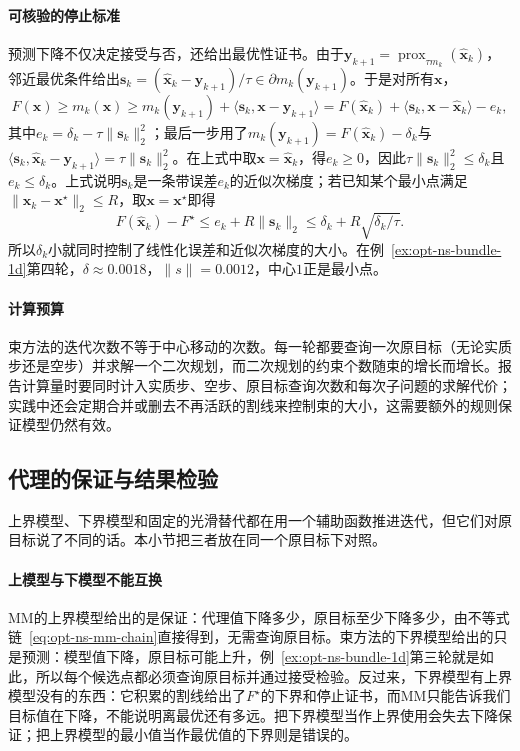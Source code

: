 \paragraph{可核验的停止标准}
预测下降不仅决定接受与否，还给出最优性证书。由于$\bm y_{k+1}=\operatorname{prox}_{\tau m_k}(\hat{\bm x}_k)$，邻近最优条件给出$\bm s_k=(\hat{\bm x}_k-\bm y_{k+1})/\tau\in\partial m_k(\bm y_{k+1})$。于是对所有$\bm x$，
\[
 F(\bm x)\geq m_k(\bm x)\geq m_k(\bm y_{k+1})+\langle\bm s_k,\bm x-\bm y_{k+1}\rangle
 =F(\hat{\bm x}_k)+\langle\bm s_k,\bm x-\hat{\bm x}_k\rangle-e_k ,
\]
其中$e_k=\delta_k-\tau\lVert\bm s_k\rVert_2^2$；最后一步用了$m_k(\bm y_{k+1})=F(\hat{\bm x}_k)-\delta_k$与$\langle\bm s_k,\hat{\bm x}_k-\bm y_{k+1}\rangle=\tau\lVert\bm s_k\rVert_2^2$。在上式中取$\bm x=\hat{\bm x}_k$，得$e_k\geq0$，因此$\tau\lVert\bm s_k\rVert_2^2\leq\delta_k$且$e_k\leq\delta_k$。上式说明$\bm s_k$是一条带误差$e_k$的近似次梯度；若已知某个最小点满足$\lVert\hat{\bm x}_k-\bm x^\star\rVert_2\leq R$，取$\bm x=\bm x^\star$即得
\[
 F(\hat{\bm x}_k)-F^\star\leq e_k+R\lVert\bm s_k\rVert_2\leq\delta_k+R\sqrt{\delta_k/\tau}.
\]
所以$\delta_k$小就同时控制了线性化误差和近似次梯度的大小。在例~\ref{ex:opt-ns-bundle-1d}第四轮，$\delta\approx0.0018$，$\lVert s\rVert=0.0012$，中心$1$正是最小点。

\paragraph{计算预算}
束方法的迭代次数不等于中心移动的次数。每一轮都要查询一次原目标（无论实质步还是空步）并求解一个二次规划，而二次规划的约束个数随束的增长而增长。报告计算量时要同时计入实质步、空步、原目标查询次数和每次子问题的求解代价；实践中还会定期合并或删去不再活跃的割线来控制束的大小，这需要额外的规则保证模型仍然有效。

\subsection{代理的保证与结果检验}
\label{sec:opt-ns-surrogate-guarantees}

上界模型、下界模型和固定的光滑替代都在用一个辅助函数推进迭代，但它们对原目标说了不同的话。本小节把三者放在同一个原目标下对照。

\paragraph{上模型与下模型不能互换}
MM的上界模型给出的是保证：代理值下降多少，原目标至少下降多少，由不等式链~\eqref{eq:opt-ns-mm-chain}直接得到，无需查询原目标。束方法的下界模型给出的只是预测：模型值下降，原目标可能上升，例~\ref{ex:opt-ns-bundle-1d}第三轮就是如此，所以每个候选点都必须查询原目标并通过接受检验。反过来，下界模型有上界模型没有的东西：它积累的割线给出了$F^\star$的下界和停止证书，而MM只能告诉我们目标值在下降，不能说明离最优还有多远。把下界模型当作上界使用会失去下降保证；把上界模型的最小值当作最优值的下界则是错误的。

